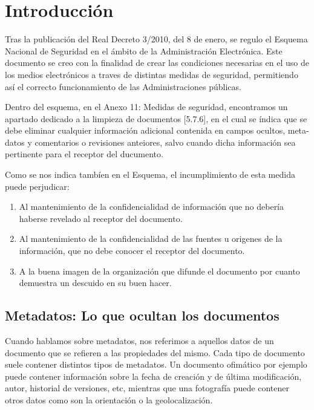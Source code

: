 \chapter{Introducción}


Tras la publicación del Real Decreto 3/2010, del 8 de enero, se regulo el Esquema Nacional de Seguridad en el ámbito 
de la Administración Electrónica. Este documento se creo con la finalidad de crear las condiciones necesarias en el
uso de los medios electrónicos a traves de distintas medidas de seguridad, permitiendo así el correcto funcionamiento de
las Administraciones públicas.


Dentro del esquema, en el Anexo 11: Medidas de seguridad, encontramos un apartado dedicado a la limpieza de documentos
[5.7.6], en el cual se índica que se debe eliminar cualquier información adicional contenida en campos ocultos, 
meta-datos y comentarios o revisiones anteiores, salvo cuando dicha información sea pertinente para el receptor del 
ducumento.

Como se nos indica tambíen en el Esquema, el incumplimiento de esta medida puede perjudicar:

\begin{enumerate}
	\item Al mantenimiento de la confidencialidad de información que no debería haberse revelado al receptor del
	documento.
	\item Al mantenimiento de la confidencialidad de las fuentes u origenes de la información, que no debe 
	conocer el receptor del documento.
	\item A la buena imagen de la organización que difunde el documento por cuanto demuestra un descuido en su buen
	hacer.
\end{enumerate}



\section{Metadatos: Lo que ocultan los documentos}

Cuando hablamos sobre metadatos, nos referimos a aquellos datos de un documento que se refieren a las propiedades del 
mismo. Cada tipo de documento suele contener distintos tipos de metadatos. Un documento ofimático por ejemplo puede 
contener información sobre la fecha de creación y de última modificación, autor, historial de versiones, etc, mientras 
que una fotografía puede contener otros datos como son la orientación o la geolocalización.


